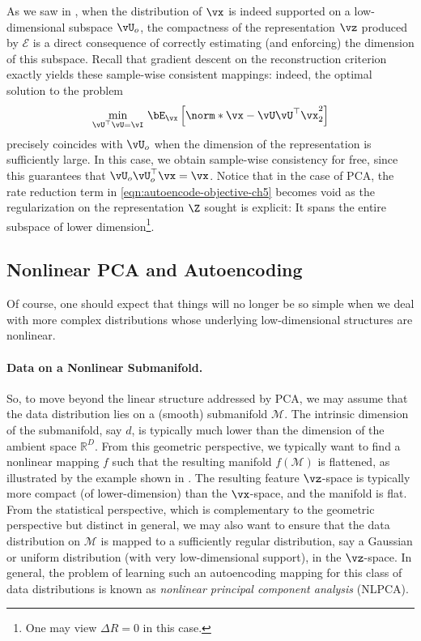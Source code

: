 \documentclass[../../book-main.tex]{subfiles}
\begin{document}
As we saw in , when the distribution of $\vx$ is indeed
supported on a low-dimensional subspace $\vU_o$, the compactness of
the representation
$\vz$ produced by $\mathcal{E}$ is a direct consequence of correctly
estimating (and enforcing) the dimension of this subspace.
Recall that gradient descent on the reconstruction criterion exactly
yields these sample-wise consistent mappings: indeed, the optimal
solution to the problem
\begin{equation}\label{eq:pca-reconstruction-ch5}
  \min_{\vU^\top \vU = \vI}\, \bE_{\vx}\left[\norm*{\vx
  - \vU\vU^\top \vx}_2^2\right]
\end{equation}
precisely coincides with $\vU_o$ when the dimension of the representation is
sufficiently large. In this case, we obtain sample-wise consistency
for free, since this guarantees that $\vU_o\vU_o^\top \vx = \vx$.
Notice that in the case of PCA, the rate reduction term in
\eqref{eqn:autoencode-objective-ch5} becomes void as the regularization
on the representation $\Z$ sought is explicit: It spans the entire
subspace of lower dimension\footnote{One may view $\Delta R = 0$ in this case.}.




\subsection{Nonlinear PCA and Autoencoding}\label{sub:nonlinear-pca}\label{sec:NLPCA}
Of course, one should expect that things will no longer be so simple
when we deal with more complex distributions whose underlying
low-dimensional structures are nonlinear.

\paragraph{Data on a Nonlinear Submanifold.} So, to move beyond the
linear structure addressed by PCA, we may assume that the data distribution lies on a (smooth) submanifold $\mathcal{M}$. The intrinsic dimension of the submanifold, say $d$, is typically much lower than the
dimension of the ambient space $\mathbb{R}^D$. From this geometric
perspective, we typically want to find a nonlinear mapping $f$ such that
the resulting manifold
$f(\mathcal{M})$ is flattened, as illustrated by the example shown in
. The resulting feature $\vz$-space
is typically
more compact (of lower-dimension) than the $\vx$-space, and the
manifold is flat.
From the statistical perspective, which is complementary to the geometric
perspective but distinct in general, we may also want to ensure that the data
distribution on $\mathcal{M}$ is mapped to a sufficiently regular
distribution, say a Gaussian or uniform distribution (with 
very low-dimensional support), in the $\vz$-space. 
In general, the problem of learning such an autoencoding mapping for this class
of data distributions is known as {\em nonlinear principal component analysis}
(NLPCA).
\end{document}
